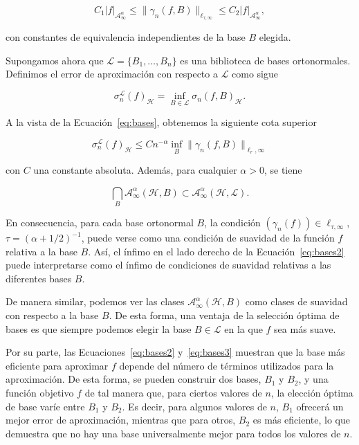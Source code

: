 \begin{equation}\label{eq:bases}
    C_1 |f|_{\mathcal{A}_\infty^\alpha} \leq \| \gamma_n(f, B) \|_{\ell_{\tau, \infty}} \leq C_2 |f|_{\mathcal{A}_\infty^\alpha},
\end{equation}

con constantes de equivalencia independientes de la base $B$ elegida.\newline

Supongamos ahora que $\mathcal{L} = \{ B_1, \ldots, B_n \}$ es una biblioteca de bases ortonormales. Definimos el error de aproximación con respecto a $\mathcal{L}$ como sigue

\[
    \sigma_n^{\mathcal{L}}(f)_{\mathcal{H}} = \inf_{B \in \mathcal{L}} \sigma_n(f, B)_{\mathcal{H}}.
\]

A la vista de la Ecuación~\eqref{eq:bases}, obtenemos la siguiente cota superior

\begin{equation}\label{eq:bases2}
    \sigma_n^{\mathcal{L}}(f)_{\mathcal{H}} \leq C n^{-\alpha} \inf_{B} \| \gamma_n(f, B) \|_{\ell_r, \infty}
\end{equation}

con $C$ una constante absoluta. Además, para cualquier $\alpha > 0$, se tiene

\begin{equation}\label{eq:bases3}
    \bigcap_{B} \mathcal{A}_\infty^\alpha (\mathcal{H}, B) \subset \mathcal{A}_\infty^\alpha (\mathcal{H}, \mathcal{L}).
\end{equation}

En consecuencia, para cada base ortonormal $B$, la condición $(\gamma_n(f)) \in \ell_{\tau, \infty}$, $\tau = (\alpha + 1/2)^{-1}$, puede verse como una condición de suavidad de la función $f$ relativa a la base $B$. Así, el ínfimo en el lado derecho de la Ecuación~\eqref{eq:bases2} puede interpretarse como el ínfimo de condiciones de suavidad relativas a las diferentes bases $B$.\newline

De manera similar, podemos ver las clases $\mathcal{A}_\infty^\alpha (\mathcal{H}, B)$ como clases de suavidad con respecto a la base $B$. De esta forma, una ventaja de la selección óptima de bases es que siempre podemos elegir la base $B \in \mathcal{L}$ en la que $f$ sea más suave.\newline

Por su parte, las Ecuaciones~\eqref{eq:bases2} y~\eqref{eq:bases3} muestran que la base más eficiente para aproximar $f$ depende del número de términos utilizados para la aproximación. De esta forma, se pueden construir dos bases, $B_1$ y $B_2$, y una función objetivo $f$ de tal manera que, para ciertos valores de $n$, la elección óptima de base varíe entre $B_1$ y $B_2$. Es decir, para algunos valores de $n$, $B_1$ ofrecerá un mejor error de aproximación, mientras que para otros, $B_2$ es más eficiente, lo que demuestra que no hay una base universalmente mejor para todos los valores de $n$.\newline

